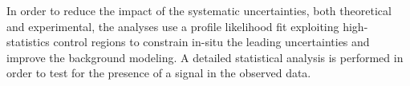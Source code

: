 In order to reduce the impact of the systematic uncertainties, both theoretical and experimental, the analyses use a profile likelihood fit exploiting high-statistics control regions to constrain in-situ the leading uncertainties and improve the background modeling.
A detailed statistical analysis is performed in order to test for the presence of a signal in the observed data.

